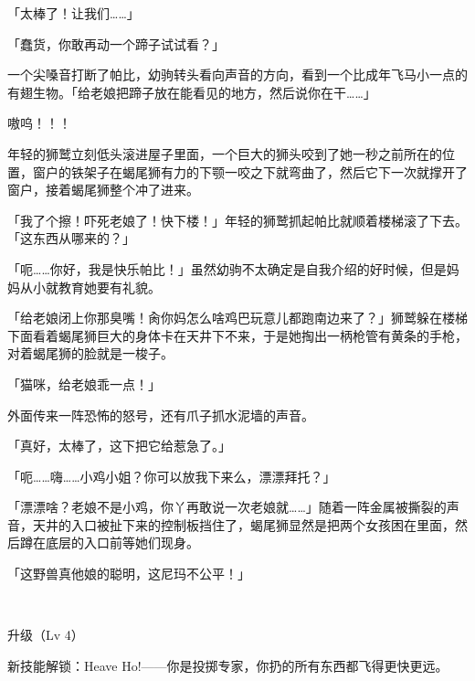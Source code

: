 「太棒了！让我们……」

「蠢货，你敢再动一个蹄子试试看？」

一个尖嗓音打断了帕比，幼驹转头看向声音的方向，看到一个比成年飞马小一点的有翅生物。「给老娘把蹄子放在能看见的地方，然后说你在干……」

嗷呜！！！

年轻的狮鹫立刻低头滚进屋子里面，一个巨大的狮头咬到了她一秒之前所在的位置，窗户的铁架子在蝎尾狮有力的下颚一咬之下就弯曲了，然后它下一次就撑开了窗户，接着蝎尾狮整个冲了进来。

「我了个擦！吓死老娘了！快下楼！」年轻的狮鹫抓起帕比就顺着楼梯滚了下去。「这东西从哪来的？」

「呃……你好，我是快乐帕比！」虽然幼驹不太确定是自我介绍的好时候，但是妈妈从小就教育她要有礼貌。

「给老娘闭上你那臭嘴！肏你妈怎么啥鸡巴玩意儿都跑南边来了？」狮鹫躲在楼梯下面看着蝎尾狮巨大的身体卡在天井下不来，于是她掏出一柄枪管有黄条的手枪，对着蝎尾狮的脸就是一梭子。

「猫咪，给老娘乖一点！」

外面传来一阵恐怖的怒号，还有爪子抓水泥墙的声音。

「真好，太棒了，这下把它给惹急了。」

「呃……嗨……小鸡小姐？你可以放我下来么，漂漂拜托？」

「漂漂啥？老娘不是小鸡，你丫再敢说一次老娘就……」随着一阵金属被撕裂的声音，天井的入口被扯下来的控制板挡住了，蝎尾狮显然是把两个女孩困在里面，然后蹲在底层的入口前等她们现身。

「这野兽真他娘的聪明，这尼玛不公平！」

~\vfill

\begin{note}
    升级（Lv 4）

    新技能解锁：Heave Ho!——你是投掷专家，你扔的所有东西都飞得更快更远。
\end{note}



